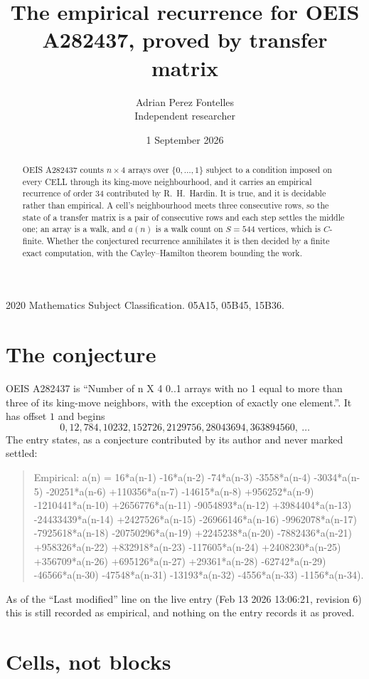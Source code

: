 \documentclass[11pt,a4paper]{article}
\title{The empirical recurrence for OEIS A282437, proved by transfer matrix}
\author{Adrian Perez Fontelles\\ \small Independent researcher}
\date{1 September 2026}
\theoremstyle{plain}
\theoremstyle{definition}
\begin{document}
\maketitle

\begin{abstract}
OEIS A282437 counts $n\times4$ arrays over $\{0,\dots,1\}$ subject to a condition imposed on
every CELL through its king-move neighbourhood, and it carries an empirical recurrence of
order $34$ contributed by R.~H.~Hardin. It is true, and it is decidable rather than
empirical. A cell's neighbourhood meets three consecutive rows, so the state of a transfer
matrix is a pair of consecutive rows and each step settles the middle one; an array is a
walk, and $a(n)$ is a walk count on $S=544$ vertices, which is $C$-finite. Whether the
conjectured recurrence annihilates it is then decided by a finite exact computation, with the
Cayley--Hamilton theorem bounding the work.
\end{abstract}

\noindent\small 2020 Mathematics Subject Classification. 05A15, 05B45, 15B36.\normalsize

\section{The conjecture}

OEIS A282437 is ``Number of n X 4 0..1 arrays with no 1 equal to more than three of its king-move neighbors, with the exception of exactly one element.''. It has offset $1$ and begins
\[
0, 12, 784, 10232, 152726, 2129756, 28043694, 363894560,\ \dots
\]
The entry states, as a conjecture contributed by its author and never marked settled:
\begin{quote}
Empirical: a(n) = 16*a(n-1) -16*a(n-2) -74*a(n-3) -3558*a(n-4) -3034*a(n-5) -20251*a(n-6) +110356*a(n-7) -14615*a(n-8) +956252*a(n-9) -1210441*a(n-10) +2656776*a(n-11) -9054893*a(n-12) +3984404*a(n-13) -24433439*a(n-14) +2427526*a(n-15) -26966146*a(n-16) -9962078*a(n-17) -7925618*a(n-18) -20750296*a(n-19) +2245238*a(n-20) -7882436*a(n-21) +958326*a(n-22) +832918*a(n-23) -117605*a(n-24) +2408230*a(n-25) +356709*a(n-26) +695126*a(n-27) +29361*a(n-28) -62742*a(n-29) -46566*a(n-30) -47548*a(n-31) -13193*a(n-32) -4556*a(n-33) -1156*a(n-34).
\end{quote}
As of the ``Last modified'' line on the live entry (Feb 13 2026 13:06:21, revision 6) this is still
recorded as empirical, and nothing on the entry records it as proved.

\section{Cells, not blocks}
\end{document}
